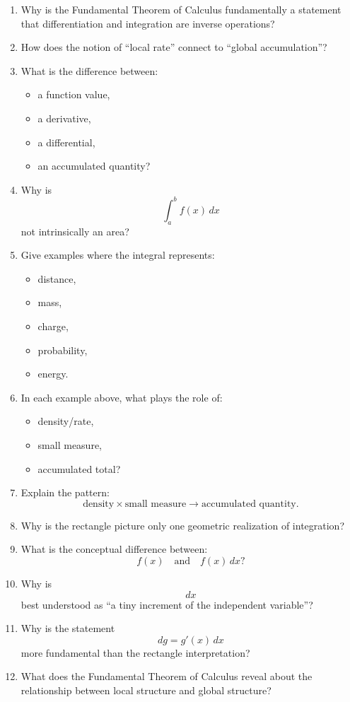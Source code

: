 \begin{enumerate}[resume]
  \item Why is the Fundamental Theorem of Calculus fundamentally a statement that differentiation and integration are inverse operations?
  \item How does the notion of ``local rate'' connect to ``global accumulation''?
  \item What is the difference between:
    \begin{itemize}
      \item a function value,
      \item a derivative,
      \item a differential,
      \item an accumulated quantity?
    \end{itemize}
  \item Why is
    \[ \int_{a}^{b} f(x)\,dx \]
    not intrinsically an area?
  \item Give examples where the integral represents:
    \begin{itemize}
      \item distance,
      \item mass,
      \item charge,
      \item probability,
      \item energy.
    \end{itemize}
  \item In each example above, what plays the role of:
    \begin{itemize}
      \item density/rate,
      \item small measure,
      \item accumulated total?
    \end{itemize}
  \item Explain the pattern:
    \[ \text{density}\times \text{small measure}\to \text{accumulated quantity}. \]
  \item Why is the rectangle picture only one geometric realization of integration?
  \item What is the conceptual difference between:
    \[ f(x) \quad \text{and}\quad f(x)\,dx? \]
  \item Why is
    \[ dx \]
    best understood as ``a tiny increment of the independent variable''?
  \item Why is the statement
    \[ dg=g'(x)\,dx \]
    more fundamental than the rectangle interpretation?
  \item What does the Fundamental Theorem of Calculus reveal about the relationship between local structure and global structure?
\end{enumerate}
